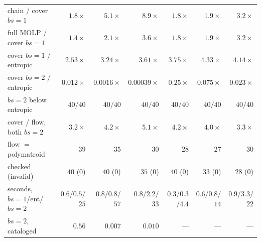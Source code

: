 \documentclass[sigconf, nonacm, acmthm=false]{acmart}
\begin{document}
\begin{table}[t]
\begin{tabular}{@{}lrrrrrr@{}}
chain / cover $bs{=}1$ & $1.8\times$ & $5.1\times$ & $8.9\times$ & $1.8\times$ & $1.9\times$ & $3.2\times$ \\
full MOLP / cover $bs{=}1$ & $1.4\times$ & $2.1\times$ & $3.6\times$ & $1.8\times$ & $1.9\times$ & $3.2\times$ \\
cover $bs{=}1$ / entropic & $2.53\times$ & $3.24\times$ & $3.61\times$ & $3.75\times$ & $4.33\times$ & $4.14\times$ \\
cover $bs{=}2$ / entropic & $0.012\times$ & $0.0016\times$ & $0.00039\times$ & $0.25\times$ & $0.075\times$ & $0.023\times$ \\
$bs{=}2$ below entropic & $40/40$ & $40/40$ & $40/40$ & $40/40$ & $40/40$ & $40/40$ \\
cover / flow, both $bs{=}2$ & $3.2\times$ & $4.2\times$ & $5.1\times$ & $4.2\times$ & $4.0\times$ & $3.3\times$ \\
flow $=$ polymatroid & $39$ & $35$ & $30$ & $28$ & $27$ & $30$ \\
checked (invalid) & $40$ ($0$) & $40$ ($0$) & $35$ ($0$) & $40$ ($0$) & $33$ ($0$) & $28$ ($0$) \\
seconds, $bs{=}1$/ent/$bs{=}2$ & $0.6$/$0.5$/$25$ & $0.8$/$0.8$/$57$ & $0.8$/$2.2$/$33$ & $0.3$/$0.3$/$4.4$ & $0.6$/$0.8$/$14$ & $0.9$/$3.3$/$22$ \\
$bs{=}2$, cataloged & $0.56$ & $0.007$ & $0.010$ & --- & --- & --- \\
\bottomrule
\end{tabular}
\end{table}
\end{document}
